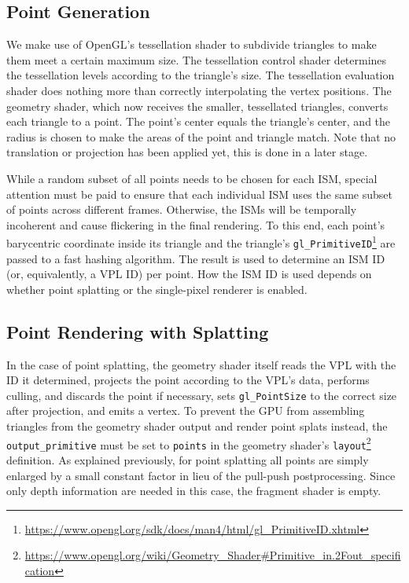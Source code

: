 \subsection{Point Generation}
\label{sec:impl:pointGeneration}

We make use of OpenGL's tessellation shader to subdivide triangles to make them meet a certain maximum size. The tessellation control shader determines the tessellation levels according to the triangle's size. The tessellation evaluation shader does nothing more than correctly interpolating the vertex positions. The geometry shader, which now receives the smaller, tessellated triangles, converts each triangle to a point. The point's center equals the triangle's center, and the radius is chosen to make the areas of the point and triangle match. Note that no translation or projection has been applied yet, this is done in a later stage.

While a random subset of all points needs to be chosen for each ISM, special attention must be paid to ensure that each individual ISM uses the same subset of points across different frames. Otherwise, the ISMs will be temporally incoherent and cause flickering in the final rendering. To this end, each point's barycentric coordinate inside its triangle and the triangle's \texttt{gl\_PrimitiveID}\footnote{\url{https://www.opengl.org/sdk/docs/man4/html/gl_PrimitiveID.xhtml}} are passed to a fast hashing algorithm. The result is used to determine an ISM ID (or, equivalently, a VPL ID) per point. How the ISM ID is used depends on whether point splatting or the single-pixel renderer is enabled.



\subsection{Point Rendering with Splatting}
\label{sec:impl:splatting}

In the case of point splatting, the geometry shader itself reads the VPL with the ID it determined, projects the point according to the VPL's data, performs culling, and discards the point if necessary, sets \texttt{gl\_PointSize} to the correct size after projection, and emits a vertex. To prevent the GPU from assembling triangles from the geometry shader output and render point splats instead, the \texttt{output\_primitive} must be set to \texttt{points} in the geometry shader's \texttt{layout}\footnote{\url{https://www.opengl.org/wiki/Geometry_Shader\#Primitive_in.2Fout_specification}} definition. As explained previously, for point splatting all points are simply enlarged by a small constant factor in lieu of the pull-push postprocessing. Since only depth information are needed in this case, the fragment shader is empty.



